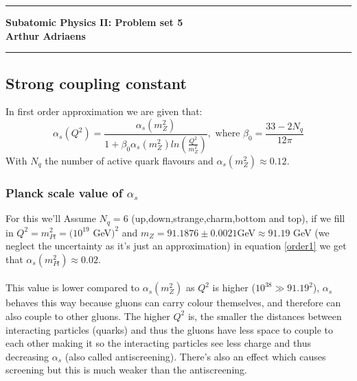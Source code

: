 \documentclass[10pt,a4paper,twoside]{article}
\begin{document}
	\begin{center}
		\hrule
		\vspace{.4cm}
		{\bf {\huge Subatomic Physics II: Problem set 5}}
		\vspace{.2cm}
		\\
		{\bf Arthur Adriaens}
		\vspace{.2cm}
		\hrule
	\end{center}
\subsection{Strong coupling constant}
In first order approximation we are given that:
\begin{equation}
	\alpha_s(Q^2) = \frac{\alpha_s(m_Z^2)}{1 + \beta_0\alpha_s(m_Z^2)ln\left(\frac{Q^2}{m_Z^2}\right)}, \text{	where	}\beta_0 = \frac{33-2N_q}{12\pi}
	\label{order1}
\end{equation}
With $N_q$ the number of active quark flavours and $\alpha_s(m_Z^2)\approx0.12$. 
\subsubsection*{Planck scale value of $\alpha_s$}
For this we'll Assume $N_q=6$ (up,down,strange,charm,bottom and top), if we fill in $Q^2 = m_{Pl}^2 = (10^{19}$ GeV$)^2$ and $m_Z = 91.1876\pm0.0021$GeV\cite{Group2020}$\approx 91.19$ GeV (we neglect the uncertainty as it's just an approximation) in equation \ref{order1} we get that $\alpha_s(m_{Pl}^2) \approx 0.02$.\\\\
\noindent
This value is lower compared to $\alpha_s(m_Z^2)$ as $Q^2$ is higher ($10^{38} \gg 91.19^2$), $\alpha_s$ behaves this way because gluons can carry colour themselves, and therefore can also couple to other gluons. The higher $Q^2$ is, the smaller the distances between interacting particles (quarks) and thus the gluons have less space to couple to each other making it so the interacting particles see less charge and thus decreasing $\alpha_s$ (also called antiscreening). There's also an effect which causes screening but this is much weaker than the antiscreening.
\end{document}
